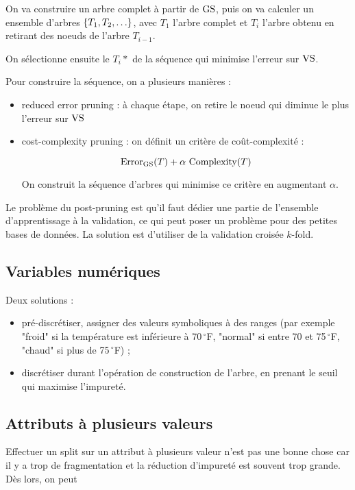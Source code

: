 		On va construire un arbre complet à partir de $\text{GS}$, puis on va calculer un ensemble d'arbres $\ens{T_1, T_2, \dots}$, avec $T_1$ l'arbre complet et $T_i$ l'arbre obtenu en retirant des noeuds de l'arbre $T_{i - 1}$.
		
		On sélectionne ensuite le $T_i*$ de la séquence qui minimise l'erreur sur $\text{VS}$.
		
		
		Pour construire la séquence, on a plusieurs manières :
		
		\begin{itemize}
			\item reduced error pruning : à chaque étape, on retire le noeud qui diminue le plus l'erreur sur $\text{VS}$
			\item cost-complexity pruning : on définit un critère de coût-complexité :
			
			$$\text{Error}_{\text{GS}}(T) + \alpha \text{ Complexity}(T)$$
			
			On construit la séquence d'arbres qui minimise ce critère en augmentant $\alpha$.
		\end{itemize}
		
		
		Le problème du post-pruning est qu'il faut dédier une partie de l'ensemble d'apprentissage à la validation, ce qui peut poser un problème pour des petites bases de données. La solution est d'utiliser de la validation croisée $k$-fold.
	
	\subsection{Variables numériques}
	
	Deux solutions :
	\begin{itemize}
		\item pré-discrétiser, assigner des valeurs symboliques à des ranges (par exemple "froid" si la température est inférieure à 70$\,^{\circ}$F, "normal" si entre 70 et 75$\,^{\circ}$F, "chaud" si plus de 75$\,^{\circ}$F) ;
		\item discrétiser durant l'opération de construction de l'arbre, en prenant le seuil qui maximise l'impureté.
	\end{itemize}
	
	\subsection{Attributs à plusieurs valeurs}
	
	Effectuer un split sur un attribut à plusieurs valeur n'est pas une bonne chose car il y a trop de fragmentation et la réduction d'impureté est souvent trop grande. Dès lors, on peut
	

